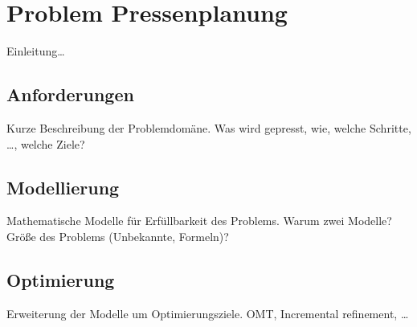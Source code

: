 \section{Problem Pressenplanung}
Einleitung\ldots

\subsection{Anforderungen}
Kurze Beschreibung der Problemdomäne.
Was wird gepresst, wie, welche Schritte, \ldots, welche Ziele?

\subsection{Modellierung}
Mathematische Modelle für Erfüllbarkeit des Problems.
Warum zwei Modelle?
Größe des Problems (Unbekannte, Formeln)?

\subsection{Optimierung}
Erweiterung der Modelle um Optimierungsziele.
OMT, Incremental refinement, \ldots